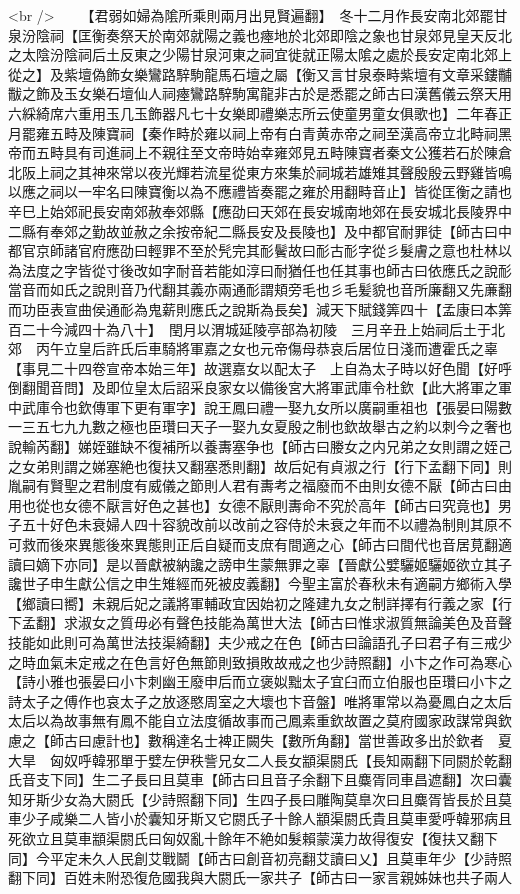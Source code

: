 <br />
　　【君弱如婦為隂所乘則兩月出見賢遍翻】　冬十二月作長安南北郊罷甘泉汾陰祠【匡衡奏祭天於南郊就陽之義也瘞地於北郊即陰之象也甘泉郊見皇天反北之太陰汾陰祠后土反東之少陽甘泉河東之祠宜徙就正陽太隂之處於長安定南北郊上從之】及紫壇偽飾女樂鸞路騂駒龍馬石壇之屬【衡又言甘泉泰畤紫壇有文章采鏤黼黻之飾及玉女樂石壇仙人祠瘞鸞路騂駒寓龍非古於是悉罷之師古曰漢舊儀云祭天用六綵綺席六重用玉几玉飾器凡七十女樂即禮樂志所云使童男童女俱歌也】二年春正月罷雍五畤及陳寶祠【秦作畤於雍以祠上帝有白青黄赤帝之祠至漢高帝立北畤祠黑帝而五畤具有司進祠上不親往至文帝時始幸雍郊見五畤陳寶者秦文公獲若石於陳倉北阪上祠之其神來常以夜光輝若流星從東方來集於祠城若雄雉其聲殷殷云野雞皆鳴以應之祠以一牢名曰陳寶衡以為不應禮皆奏罷之雍於用翻畤音止】皆從匡衡之請也辛巳上始郊祀長安南郊赦奉郊縣【應劭曰天郊在長安城南地郊在長安城北長陵界中二縣有奉郊之勤故並赦之余按帝紀二縣長安及長陵也】及中都官耐罪徒【師古曰中都官京師諸官府應劭曰輕罪不至於髠完其耏鬢故曰耏古耏字從彡髮膚之意也杜林以為法度之字皆從寸後改如字耐音若能如淳曰耐猶任也任其事也師古曰依應氏之說耏當音而如氏之說則音乃代翻其義亦兩通耏謂頬旁毛也彡毛髪貌也音所廉翻又先亷翻而功臣表宣曲侯通耏為鬼薪則應氏之說斯為長矣】減天下賦錢筭四十【孟康曰本筭百二十今減四十為八十】　閏月以渭城延陵亭部為初陵　三月辛丑上始祠后土于北郊　丙午立皇后許氏后車騎將軍嘉之女也元帝傷母恭哀后居位日淺而遭霍氏之辜【事見二十四卷宣帝本始三年】故選嘉女以配太子　上自為太子時以好色聞【好呼倒翻聞音問】及即位皇太后詔采良家女以備後宮大將軍武庫令杜欽【此大將軍之軍中武庫令也欽傳軍下更有軍字】說王鳳曰禮一娶九女所以廣嗣重祖也【張晏曰陽數一三五七九九數之極也臣瓚曰天子一娶九女夏殷之制也欽故舉古之約以刺今之奢也說輸芮翻】娣姪雖缺不復補所以養夀塞争也【師古曰媵女之内兄弟之女則謂之姪己之女弟則謂之娣塞絶也復扶又翻塞悉則翻】故后妃有貞淑之行【行下孟翻下同】則胤嗣有賢聖之君制度有威儀之節則人君有夀考之福廢而不由則女德不厭【師古曰由用也從也女德不厭言好色之甚也】女德不厭則夀命不究於高年【師古曰究竟也】男子五十好色未衰婦人四十容貌改前以改前之容侍於未衰之年而不以禮為制則其原不可救而後來異態後來異態則正后自疑而支庶有間適之心【師古曰間代也音居莧翻適讀曰嫡下亦同】是以晉獻被納讒之謗申生蒙無罪之辜【晉獻公嬖驪姬驪姬欲立其子讒世子申生獻公信之申生雉經而死被皮義翻】今聖主富於春秋未有適嗣方鄉術入學【鄉讀曰嚮】未親后妃之議將軍輔政宜因始初之隆建九女之制詳擇有行義之家【行下孟翻】求淑女之質毋必有聲色技能為萬世大法【師古曰惟求淑質無論美色及音聲技能如此則可為萬世法技渠綺翻】夫少戒之在色【師古曰論語孔子曰君子有三戒少之時血氣未定戒之在色言好色無節則致損敗故戒之也少詩照翻】小卞之作可為寒心【詩小雅也張晏曰小卞刺幽王廢申后而立褒姒黜太子宜臼而立伯服也臣瓚曰小卞之詩太子之傅作也哀太子之放逐愍周室之大壞也卞音盤】唯將軍常以為憂鳳白之太后太后以為故事無有鳳不能自立法度循故事而己鳳素重欽故置之莫府國家政謀常與欽慮之【師古曰慮計也】數稱達名士裨正闕失【數所角翻】當世善政多出於欽者　夏大旱　匈奴呼韓邪單于嬖左伊秩訾兄女二人長女顓渠閼氏【長知兩翻下同閼於乾翻氏音支下同】生二子長曰且莫車【師古曰且音子余翻下且麋胥同車昌遮翻】次曰囊知牙斯少女為大閼氏【少詩照翻下同】生四子長曰雕陶莫臯次曰且麋胥皆長於且莫車少子咸樂二人皆小於囊知牙斯又它閼氏子十餘人顓渠閼氏貴且莫車愛呼韓邪病且死欲立且莫車顓渠閼氏曰匈奴亂十餘年不絶如髮賴蒙漢力故得復安【復扶又翻下同】今平定未久人民創艾戰鬬【師古曰創音初亮翻艾讀曰乂】且莫車年少【少詩照翻下同】百姓未附恐復危國我與大閼氏一家共子【師古曰一家言親姊妹也共子兩人